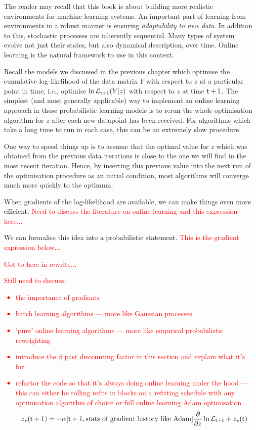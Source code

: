 The reader may recall that this book is about building more realistic environments for machine learning systems. An important part of learning from environments in a robust manner is ensuring \emph{adaptability to new data}. In addition to this, stochastic processes are inherently sequential. Many types of system evolve not just their states, but also dynamical description, over time. Online learning is the natural framework to use in this context.

Recall the models we discussed in the previous chapter which optimise the cumulative log-likelihood of the data matrix $Y$ with respect to $z$ at a particular point in time, i.e., optimise $\ln {\cal L}_{{\sf t}+1}(Y\vert z)$ with respect to $z$ at time ${\sf t}+1$. The simplest (and most generally applicable) way to implement an online learning approach in these probabilistic learning models is to rerun the whole optimisation algorithm for $z$ after each new datapoint has been received. For algorithms which take a long time to run in each case, this can be an extremely slow procedure. 

One way to speed things up is to assume that the optimal value for $z$ which was obtained from the previous data iterations is close to the one we will find in the most recent iteration. Hence, by inserting this previous value into the next run of the optimisation procedure as an initial condition, most algorithms will converge much more quickly to the optimum. 

When gradients of the log-likelihood are available, we can make things even more efficient. \textcolor{red}{Need to discuss the literature on online learning and this expression here...}

We can formalise this idea into a probabilistic statement. \textcolor{red}{This is the gradient expression below...}

\textcolor{red}{Got to here in rewrite...}
\textcolor{red}{Still need to discuss:
\begin{itemize}
\item{the importance of gradients}
\item{batch learning algorithms --- more like Gaussian processes}
\item{`pure' online learning algorithms --- more like empirical probabilistic reweighting}
\item{introduce the $\beta$ past discounting factor in this section and explain what it's for}
\item{refactor the code so that it's always doing online learning under the hood --- this can either be rolling refits in blocks on a refitting schedule with any optimisation algorithm of choice or full online learning Adam optimisation $$z_*({\sf t}+1) = -\alpha [{\sf t}+1,\text{stats of gradient history like Adam}] \frac{\partial}{\partial z} \ln {\cal L}_{{\sf t}+1} + z_*({\sf t})$$}
\end{itemize}}


